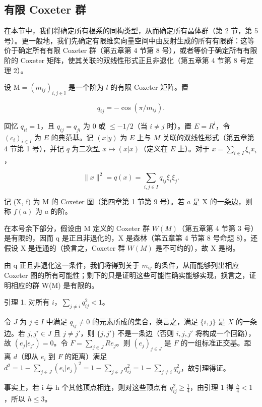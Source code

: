\subsection{有限 Coxeter 群}

在本节中，我们将确定所有根系的同构类型，从而确定所有晶体群（第 2 节，第 5 号）。更一般地，我们先确定有限维实向量空间中由反射生成的所有有限群：这等价于确定所有有限 Coxeter 群（第五章第 4 节第 8 号），或者等价于确定所有有限阶的 Coxeter 矩阵，使其关联的双线性形式正且非退化（第五章第 4 节第 8 号定理 2）。

设 \(\mathrm{M} = (m_{ij})_{i,j\in \mathbb{I}}\) 是一个阶为 \(l\) 的有限 Coxeter 矩阵。置

\[
q _ {i j} = - \cos (\pi / m _ {i j}).
\]

回忆 \(q_{ii} = 1\)，且 \(q_{ij} = q_{ji}\) 为 0 或 \(\leqslant -1/2\)（当 \(i \neq j\) 时）。置 \(E = R^l\)，令 \((c_i)_{i \in I}\) 为 \(E\) 的典范基。记 \((x|y)\) 为 \(E\) 上与 \(M\) 关联的双线性形式（第五章第 4 节第 1 号），并记 \(q\) 为二次型 \(x \mapsto (x|x)\)（定义在 \(E\) 上）。对于 \(x = \sum_{i \in I} \xi_i x_i\)，

\[
\| x \| ^ {2} = q (x) = \sum_ {i, j \in I} q _ {i j} \xi_ {i} \xi_ {j}.
\]

记 (X, f) 为 M 的 Coxeter 图（第四章第 1 节第 9 号）。若 \(a\) 是 X 的一条边，则称 \(f(a)\) 为 \(a\) 的阶。

在本号余下部分，假设由 M 定义的 Coxeter 群 \(W(M)\)（第五章第 4 节第 3 号）是有限的，因而 q 是正且非退化的，X 是森林（第五章第 4 节第 8 号命题 8）。还假设 X 是连通的（换言之，Coxeter 群 \(W(M)\) 是不可约的），故 X 是树。

由 q 正且非退化这一条件，我们将得到关于 \(m_{ij}\) 的条件，从而能够列出相应 Coxeter 图的所有可能性；剩下的只是证明这些可能性确实能够实现，换言之，证明相应的群 W(M) 是有限的。

引理 1. 对所有 \(i\)，\(\sum_{j \neq i} q_{ij}^2 < 1\)。

令 \(J\) 为 \(j \in I\) 中满足 \(q_{ij} \neq 0\) 的元素所成的集合，换言之，满足 \(\{i, j\}\) 是 \(X\) 的一条边。若 \(j, j' \in J\) 且 \(j \neq j'\)，则 \(\{j, j'\}\) 不是一条边（否则 \(i, j, j'\) 将构成一个回路），故 \((e_j | e_{j'}) = 0\)。令 \(F = \sum_{j \in J} R e_j\)。则 \((e_j)_{j \in J}\) 是 \(F\) 的一组标准正交基。距离 \(d\)（即从 \(e_i\) 到 \(F\) 的距离）满足 \(d^2 = 1 - \sum_{j \in J} (e_i | e_j)^2 = 1 - \sum_{j \in J} q_{ij}^2 = 1 - \sum_{j \neq i} q_{ij}^2\)，故引理得证。

事实上，若 i 与 h 个其他顶点相连，则对这些顶点有 \(q_{ij}^{2} \geqslant \frac{1}{4}\)，由引理 1 得 \(\frac{h}{4} < 1\)，所以 \(h \leqslant 3\)。

